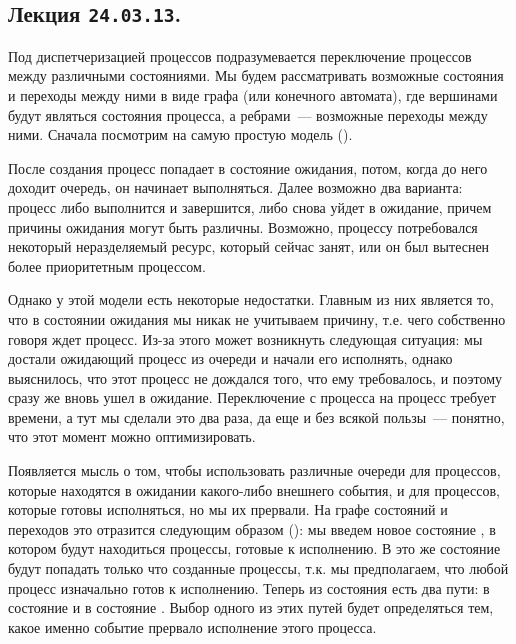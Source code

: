 \subsection{%
  Лекция \texttt{24.03.13}.%
}


Под диспетчеризацией процессов подразумевается переключение процессов между
различными состояниями. Мы будем рассматривать возможные состояния и переходы
между ними в виде графа (или конечного автомата), где вершинами будут являться
состояния процесса, а ребрами~--- возможные переходы между ними. Сначала
посмотрим на самую простую модель ().


После создания процесс попадает в состояние ожидания, потом, когда до него
доходит очередь, он начинает выполняться. Далее возможно два варианта: процесс
либо выполнится и завершится, либо снова уйдет в ожидание, причем причины
ожидания могут быть различны. Возможно, процессу потребовался некоторый
неразделяемый ресурс, который сейчас занят, или он был вытеснен более
приоритетным процессом.

Однако у этой модели есть некоторые недостатки. Главным из них является то, что
в состоянии ожидания мы никак не учитываем причину, т.е. чего собственно говоря
ждет процесс. Из-за этого может возникнуть следующая ситуация: мы достали
ожидающий процесс из очереди и начали его исполнять, однако выяснилось, что этот
процесс не дождался того, что ему требовалось, и поэтому сразу же вновь ушел в
ожидание. Переключение с процесса на процесс требует времени, а тут мы сделали
это два раза, да еще и без всякой пользы~--- понятно, что этот момент можно
оптимизировать.

Появляется мысль о том, чтобы использовать различные очереди для процессов,
которые находятся в ожидании какого-либо внешнего события, и для процессов,
которые готовы исполняться, но мы их прервали. На графе состояний и переходов
это отразится следующим образом (): мы введем новое состояние
, в котором будут находиться процессы, готовые к исполнению. В это
же состояние будут попадать только что созданные процессы, т.к. мы предполагаем,
что любой процесс изначально готов к исполнению. Теперь из состояния
 есть два пути: в состояние  и в состояние
. Выбор одного из этих путей будет определяться тем, какое именно
событие прервало исполнение этого процесса.

